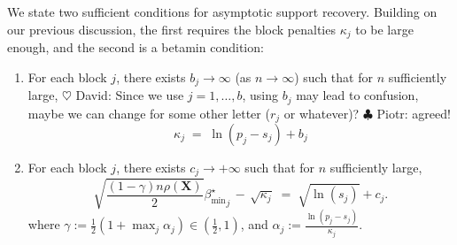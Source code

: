 \documentclass[aos]{imsart}
\theoremstyle{plain}
\newcommand{\david}[1]{{\small{\color{blue} \sf $\heartsuit$ David: #1}}}
\newcommand{\piotr}[1]{{\small{\color{red} \sf $\clubsuit$ Piotr: #1}}}
\newcommand{\bs}{\boldsymbol}
\begin{document}
We state two sufficient conditions for asymptotic support recovery. %
Building on our previous discussion, the first requires the block penalties $\kappa_j$ to be large enough,  
and the second is a betamin condition: 
\begin{enumerate}[start=6,label={(A\arabic*)}]
    \item For each block $j$, there exists $b_{j}\to \infty$ (as $n\to \infty$) such that for $n$ sufficiently large, %
    \david{Since we use $j=1,\ldots,b$, using $b_j$ may lead to confusion, maybe we can change for some other letter ($r_j$ or whatever)?}\piotr{agreed!}
\begin{equation}\label{cond:suffIreg}
    \kappa_j \;=\;\ln(p_j-s_j) + b_{j}
\end{equation}\item For each block $j$, there exists $c_{j}\to +\infty$ such that for $n$ sufficiently large, %
    \begin{equation}\label{cond:suffIIreg}
        \sqrt{\frac{(1-\gamma) n\rho(\bs X)}{2}}{{\beta_{\min}^{\star}}_j} \,- \,\sqrt{\kappa_j} \;=\; \sqrt{\ln(s_j)} + c_{j} .
    \end{equation}
where $\gamma:=\frac12(1+\max_j \alpha_j)\in (\tfrac12,1)$, and
$\alpha_j:=\frac{\ln(p_j-s_j)}{\kappa_j}$.
\end{enumerate}
\end{document}
